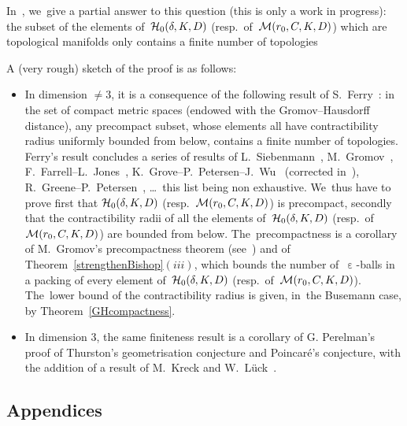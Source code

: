 \documentclass[pdftex]{sigma}
\numberwithin{equation}{section}
\newcommand{\e}{\operatorname{\varepsilon}}
\begin{document}
In~\cite{BCGS2}, we~give a partial answer to this question (this is only a work in progress):
the subset of the elements of~${\cal H}_0 (\delta, K, D)$
(resp.\ of~${\cal M} (r_0, C, K, D)$) which are topological manifolds only contains a finite number of topologies

A (very rough) sketch of the proof is as follows:
\begin{itemize}\itemsep=0pt
\item
In dimension $\ne 3$, it is a consequence of the following result of S.~Ferry~\cite[Theorem~1]{Fe}: in the set of compact metric spaces
(endowed with the Gromov--Hausdorff distance), any precompact subset, whose elements all have contractibility radius uniformly bounded from below, contains a finite number of topologies. Ferry's result concludes a series
of results of L.~Siebenmann~\cite{Sie}, M.~Gromov~\cite{Gro-Large}, F.~Farrell--L.~Jones~\cite{FJ}, K.~Grove--P.~Petersen--J.~Wu~\cite{GPW} (corrected in~\cite{GrPW}), R.~Greene--P.~Petersen~\cite{GPe}, \dots\ this list being
non exhaustive. We~thus have to prove first that
${\cal H}_0 (\delta, K, D)$ (resp.\ ${\cal M} (r_0, C, K, D)$) is precompact, secondly that the contractibility radii of all the elements of~${\cal H}_0 (\delta, K, D)$ (resp.\ of~${\cal M} (r_0, C, K, D)$) are bounded from below. The~precompactness is a corollary of
M.~Gromov's precompactness theorem (see~\cite[Proposition~5.2]{Gr1}) and of Theorem~\ref{strengthenBishop}$(iii)$, which bounds the number of~$\e$-balls
in a packing of every element of~${\cal H}_0 (\delta, K, D)$ (resp.\ of~${\cal M} (r_0, C, K, D)$). The~lower bound of the contractibility radius is given, in~the Busemann case, by Theorem~\ref{GHcompactness}.

\item In dimension 3, the same finiteness result is a corollary of G. Perelman's proof of Thurston's geometrisation conjecture and Poincar\'e's conjecture, with the addition of a result of M.~Kreck and W.~L\"uck~\cite[Theorem~0.7]{KL}.
\end{itemize}

\subsection{Appendices}
\end{document}
